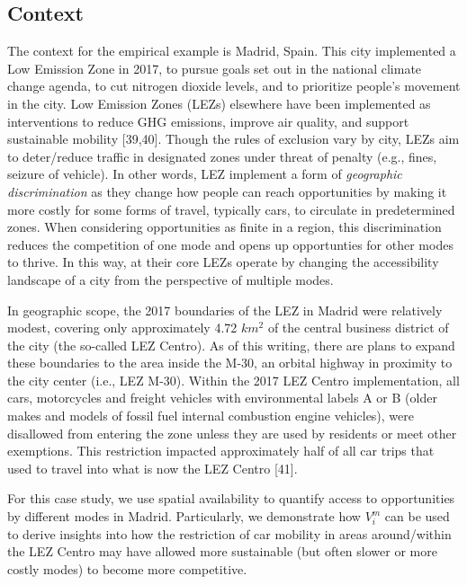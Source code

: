 \documentclass[10pt,letterpaper]{article}
\begin{document}
\hypertarget{context}{%
\subsection{Context}\label{context}}

The context for the empirical example is Madrid, Spain. This city
implemented a Low Emission Zone in 2017, to pursue goals set out in the
national climate change agenda, to cut nitrogen dioxide levels, and to
prioritize people's movement in the city. Low Emission Zones (LEZs)
elsewhere have been implemented as interventions to reduce GHG
emissions, improve air quality, and support sustainable mobility
{[}39,40{]}. Though the rules of exclusion vary by city, LEZs aim to
deter/reduce traffic in designated zones under threat of penalty (e.g.,
fines, seizure of vehicle). In other words, LEZ implement a form of
\emph{geographic discrimination} as they change how people can reach
opportunities by making it more costly for some forms of travel,
typically cars, to circulate in predetermined zones. When considering
opportunities as finite in a region, this discrimination reduces the
competition of one mode and opens up opportunties for other modes to
thrive. In this way, at their core LEZs operate by changing the
accessibility landscape of a city from the perspective of multiple
modes.

In geographic scope, the 2017 boundaries of the LEZ in Madrid were
relatively modest, covering only approximately 4.72 \(km^2\) of the
central business district of the city (the so-called LEZ Centro). As of
this writing, there are plans to expand these boundaries to the area
inside the M-30, an orbital highway in proximity to the city center
(i.e., LEZ M-30). Within the 2017 LEZ Centro implementation, all cars,
motorcycles and freight vehicles with environmental labels A or B (older
makes and models of fossil fuel internal combustion engine vehicles),
were disallowed from entering the zone unless they are used by residents
or meet other exemptions. This restriction impacted approximately half
of all car trips that used to travel into what is now the LEZ Centro
{[}41{]}.

For this case study, we use spatial availability to quantify access to
opportunities by different modes in Madrid. Particularly, we demonstrate
how \(V_i^m\) can be used to derive insights into how the restriction of
car mobility in areas around/within the LEZ Centro may have allowed more
sustainable (but often slower or more costly modes) to become more
competitive.
\end{document}

